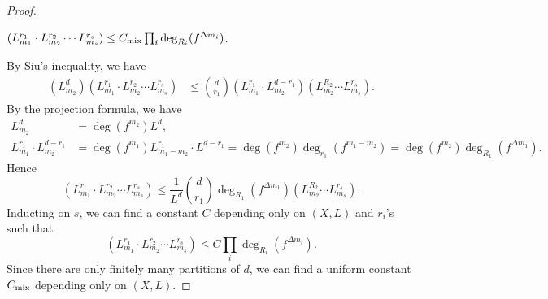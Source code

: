   \begin{proof}
    \hspace{1em}
    \begin{step}\label{step1_in_proof_of_estimation_of_mixed_degrees}
      $(L_{m_1}^{r_1} \cdot L_{m_2}^{r_2} \cdots L_{m_s}^{r_s}) \leq C_{\text{mix}} \prod_i \deg_{R_i}(f^{\Delta m_i})$.
    \end{step}
    By Siu's inequality, we have
    \begin{align*}
      (L_{m_2}^{d}) (L_{m_1}^{r_1} \cdot L_{m_2}^{r_2} \cdots L_{m_s}^{r_s}) &\leq \binom{d}{r_1} (L_{m_1}^{r_1} \cdot L_{m_2}^{d-r_1}) (L_{m_2}^{R_2} \cdots L_{m_s}^{r_s}).
    \end{align*}
    By the projection formula, we have 
    \begin{align*}
      L_{m_2}^d &= \deg(f^{m_2}) L^d, \\
      L_{m_1}^{r_1} \cdot L_{m_2}^{d-r_1} &= \deg(f^{m_1}) L^{r_1}_{m_1-m_2} \cdot L^{d-r_1} = \deg(f^{m_2}) \deg_{r_1}(f^{m_1 - m_2}) = \deg(f^{m_2}) \deg_{R_1}(f^{\Delta m_1}).
    \end{align*}
    Hence 
    \[ (L_{m_1}^{r_1} \cdot L_{m_2}^{r_2} \cdots L_{m_s}^{r_s}) \leq \frac{1}{L^d} \binom{d}{r_1} \deg_{R_1}(f^{\Delta m_1}) (L_{m_2}^{R_2} \cdots L_{m_s}^{r_s}). \]
    Inducting on $s$, we can find a constant $C$ depending only on $(X,L)$ and $r_i$'s such that
    \[ (L_{m_1}^{r_1} \cdot L_{m_2}^{r_2} \cdots L_{m_s}^{r_s}) \leq C \prod_i \deg_{R_i}(f^{\Delta m_i}). \]
    Since there are only finitely many partitions of $d$, we can find a uniform constant $C_{\text{mix}}$ depending only on $(X,L)$.



\end{proof}
